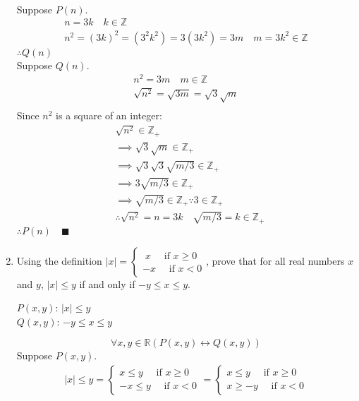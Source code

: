 \documentclass[letterpaper, 12pt]{article}
\newcommand{\qed}{\quad \blacksquare}
\begin{document}
\begin{enumerate}
\begin{multline*}
\end{multline*}
Suppose $P(n)$.
\begin{gather*}
    n = 3k \quad k \in \mathbb{Z} \\
    n^2 = (3k)^2 = (3^2 k^2) = 3(3k^2) = 3m \quad m = 3k^2 \in \mathbb{Z}
\end{gather*}
$\therefore Q(n)$ \\
Suppose $Q(n)$.
\begin{gather*}
    n^2 = 3m \quad m \in \mathbb{Z} \\
    \sqrt{n^2} = \sqrt{3m} = \sqrt{3}\sqrt{m} \\
\end{gather*}
Since $n^2$ is a square of an integer:
\begin{align*}
    & \sqrt{n^2} \in \mathbb{Z}_+ \\
    &\implies \sqrt{3}\sqrt{m} \in \mathbb{Z}_+ \\
    &\implies \sqrt{3}\sqrt{3}\sqrt{m/3} \in \mathbb{Z}_+ \\
    &\implies 3\sqrt{m/3} \in \mathbb{Z}_+ \\
    &\implies \sqrt{m/3} \in \mathbb{Z}_+ \because 3 \in \mathbb{Z}_+ \\
    &\therefore \sqrt{n^2} = n = 3k \quad \sqrt{m/3} = k \in \mathbb{Z}_+
\end{align*}
$\therefore P(n) \qed$
\pagebreak
\item Using the definition $|x| = \begin{cases}
    \; x \quad \text{ if } x \ge 0 \\
    -x \quad \text{ if } x < 0
\end{cases}$, 
prove that for all real numbers $x$ and $y$, $|x| \le y$ if and only if $-y \le x \le y$.
\begin{flushleft}
    $P(x, y)$: $|x| \le y$ \\
    $Q(x, y)$: $-y \le x \le y$
\end{flushleft}
\[\forall x, y \in \mathbb{R}(P(x, y) \leftrightarrow Q(x, y))\]
Suppose $P(x, y)$.
\begin{gather*}
    |x| \le y = \begin{cases}
        x \le y \quad \text{ if } x \ge 0 \\
        -x \le y \quad \text{ if } x < 0
    \end{cases} = \begin{cases}
        x \le y \quad \text{ if } x \ge 0 \\
        x \ge -y \quad \text{ if } x < 0
    \end{cases}

\end{gather*}
\end{enumerate}
\end{document}
